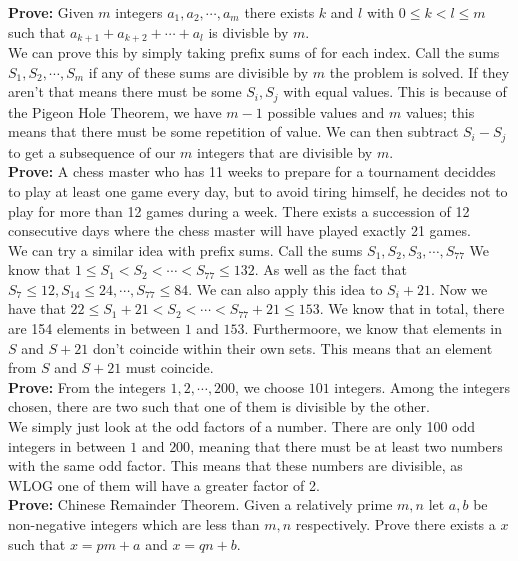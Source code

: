 \documentclass[12pt]{article}
\begin{document}
\noindent 
\textbf{Prove:} Given $m$ integers $a_1, a_2, \cdots, a_m$ there exists $k$ and $l$ with 
$0 \le k < l \le m$ such that $a_{k+1} + a_{k+2} + \cdots + a_l$ is divisble by $m$. \\

We can prove this by simply taking prefix sums of for each index. Call the sums $S_1, S_2, \cdots, S_m$
if any of these sums are divisible by $m$ the problem is solved. If they aren't that means 
there must be some $S_i, S_j$ with equal values. This is because of the Pigeon Hole Theorem, we 
have $m-1$ possible values and $m$ values; this means that there must be some repetition of value. 
We can then subtract $S_i-S_j$ to get a subsequence of our $m$ integers that are divisible by $m$.\\

\noindent 
\textbf{Prove:} A chess master who has 11 weeks to prepare for a tournament deciddes to play at least
one game every day, but to avoid tiring himself, he decides not to play for more than 12 games during a week. 
There exists a succession of 12 consecutive days where the chess master will have played exactly 21 games.\\

We can try a similar idea with prefix sums. Call the sums $S_1, S_2, S_3, \cdots, S_{77}$ 
We know that $1 \le S_1 < S_2 < \cdots < S_{77} \le 132$. As well as the fact that 
$S_{7} \le 12, S_{14} \le 24, \cdots, S_{77} \le 84$. We can also apply this idea to $S_i + 21$.
Now we have that $22 \le S_1 + 21 < S_2 < \cdots < S_77 + 21 \le 153$. We know that in total, there are 154 elements in between 
$1$ and $153$. Furthermoore, we know that elements in $S$ and $S + 21$ don't coincide within their own sets. This means
that an element from $S$ and $S + 21$ must coincide. \\

\noindent 
\textbf{Prove:} From the integers $1,2,\cdots,200$, we choose $101$ integers. 
Among the integers chosen, there are two such that one of them is divisible by the other.\\

We simply just look at the odd factors of a number. There are only 100 odd integers in between 
$1$ and $200$, meaning that there must be at least two numbers with the same odd factor. This means that 
these numbers are divisible, as WLOG one of them will have a greater factor of 2.\\

\noindent 
\textbf{Prove:} Chinese Remainder Theorem. Given a relatively prime $m,n$ let $a,b$ be non-negative integers which are less than 
$m, n$ respectively. Prove there exists a $x$ such that $x = pm + a$ and $x = qn + b$.\\
\end{document}
